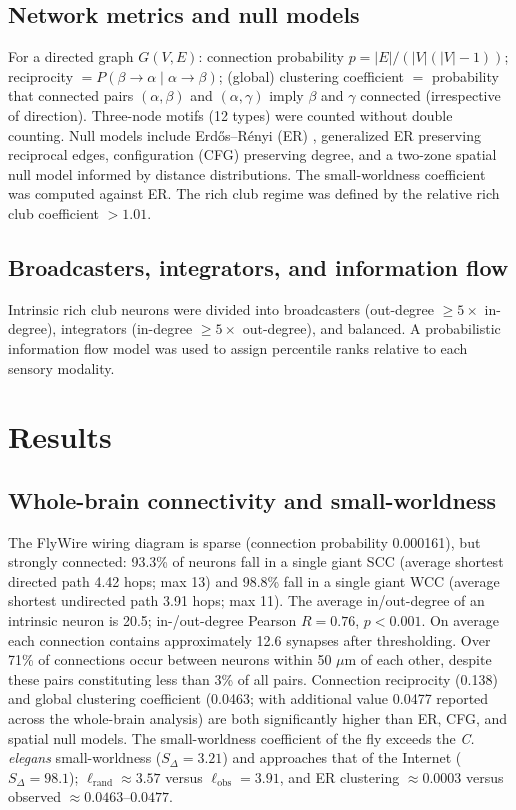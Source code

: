 \documentclass[11pt]{article}
\begin{document}
\subsection{Network metrics and null models}
For a directed graph $G(V,E)$: connection probability $p = |E|/(|V|(|V|-1))$; reciprocity $= P(\beta \to \alpha \mid \alpha \to \beta)$; (global) clustering coefficient $=$ probability that connected pairs $(\alpha,\beta)$ and $(\alpha,\gamma)$ imply $\beta$ and $\gamma$ connected (irrespective of direction). Three-node motifs (12 types) were counted without double counting. Null models include Erd\H{o}s--R\'enyi (ER) \cite{erdos1959random}, generalized ER preserving reciprocal edges, configuration (CFG) preserving degree, and a two-zone spatial null model informed by distance distributions. The small-worldness coefficient was computed against ER. The rich club regime was defined by the relative rich club coefficient $> 1.01$.

\subsection{Broadcasters, integrators, and information flow}
Intrinsic rich club neurons were divided into broadcasters (out-degree $\geq 5\times$ in-degree), integrators (in-degree $\geq 5\times$ out-degree), and balanced. A probabilistic information flow model \cite{dorkenwald2023neuronal,schlegel2021information} was used to assign percentile ranks relative to each sensory modality.

\section{Results}
\subsection{Whole-brain connectivity and small-worldness}
The FlyWire wiring diagram is sparse (connection probability 0.000161), but strongly connected: 93.3\% of neurons fall in a single giant SCC (average shortest directed path 4.42 hops; max 13) and 98.8\% fall in a single giant WCC (average shortest undirected path 3.91 hops; max 11). The average in/out-degree of an intrinsic neuron is 20.5; in-/out-degree Pearson $R = 0.76$, $p < 0.001$. On average each connection contains approximately 12.6 synapses after thresholding. Over 71\% of connections occur between neurons within 50 $\mu$m of each other, despite these pairs constituting less than 3\% of all pairs. Connection reciprocity (0.138) and global clustering coefficient (0.0463; with additional value 0.0477 reported across the whole-brain analysis) are both significantly higher than ER, CFG, and spatial null models. The small-worldness coefficient of the fly exceeds the \emph{C. elegans} small-worldness ($S_\Delta = 3.21$) and approaches that of the Internet ($S_\Delta = 98.1$); $\ell_{\mathrm{rand}} \approx 3.57$ versus $\ell_{\mathrm{obs}} = 3.91$, and ER clustering $\approx 0.0003$ versus observed $\approx 0.0463$--$0.0477$.
\end{document}
